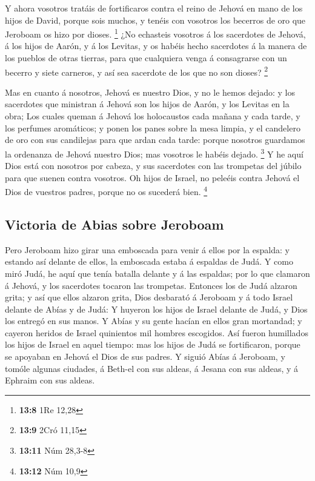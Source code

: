  Y ahora vosotros tratáis de fortificaros contra el reino de
Jehová en mano de los hijos de David, porque sois muchos, y tenéis con
vosotros los becerros de oro que Jeroboam os hizo por dioses.
\footnote{\textbf{13:8} 1Re 12,28}  ¿No echasteis vosotros á
los sacerdotes de Jehová, á los hijos de Aarón, y á los Levitas, y os
habéis hecho sacerdotes á la manera de los pueblos de otras tierras,
para que cualquiera venga á consagrarse con un becerro y siete carneros,
y así sea sacerdote de los que no son dioses? \footnote{\textbf{13:9}
  2Cró 11,15}

 Mas en cuanto á nosotros, Jehová es nuestro Dios, y no le
hemos dejado: y los sacerdotes que ministran á Jehová son los hijos de
Aarón, y los Levitas en la obra;  Los cuales queman á
Jehová los holocaustos cada mañana y cada tarde, y los perfumes
aromáticos; y ponen los panes sobre la mesa limpia, y el candelero de
oro con sus candilejas para que ardan cada tarde: porque nosotros
guardamos la ordenanza de Jehová nuestro Dios; mas vosotros le habéis
dejado. \footnote{\textbf{13:11} Núm 28,3-8}  Y he aquí
Dios está con nosotros por cabeza, y sus sacerdotes con las trompetas
del júbilo para que suenen contra vosotros. Oh hijos de Israel, no
peleéis contra Jehová el Dios de vuestros padres, porque no os sucederá
bien. \footnote{\textbf{13:12} Núm 10,9}

\hypertarget{victoria-de-abias-sobre-jeroboam}{%
\subsection{Victoria de Abias sobre
Jeroboam}\label{victoria-de-abias-sobre-jeroboam}}

 Pero Jeroboam hizo girar una emboscada para venir á ellos
por la espalda: y estando así delante de ellos, la emboscada estaba á
espaldas de Judá.  Y como miró Judá, he aquí que tenía
batalla delante y á las espaldas; por lo que clamaron á Jehová, y los
sacerdotes tocaron las trompetas.  Entonces los de Judá
alzaron grita; y así que ellos alzaron grita, Dios desbarató á Jeroboam
y á todo Israel delante de Abías y de Judá:  Y huyeron los
hijos de Israel delante de Judá, y Dios los entregó en sus manos.
 Y Abías y su gente hacían en ellos gran mortandad; y
cayeron heridos de Israel quinientos mil hombres escogidos.
 Así fueron humillados los hijos de Israel en aquel tiempo:
mas los hijos de Judá se fortificaron, porque se apoyaban en Jehová el
Dios de sus padres.  Y siguió Abías á Jeroboam, y tomóle
algunas ciudades, á Beth-el con sus aldeas, á Jesana con sus aldeas, y á
Ephraim con sus aldeas.

